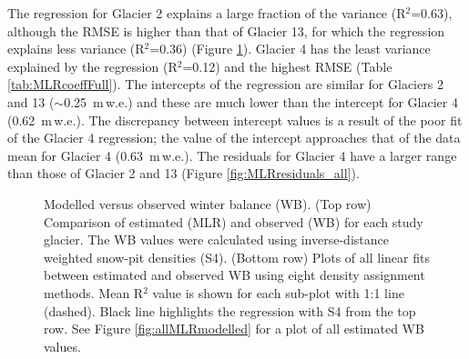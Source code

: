 \documentclass{sfuthesis}
\begin{document}
The regression for Glacier 2 explains a large fraction of the variance (R$^2$=0.63), although the RMSE is higher than that of Glacier 13, for which the regression explains less variance (R$^2$=0.36) (Figure \ref{fig:MLRfit}). Glacier 4 has the least variance explained by the regression (R$^2$=0.12) and the highest RMSE (Table \ref{tab:MLRcoeffFull}). The intercepts of the regression are similar for Glaciers 2 and 13 ($\sim$0.25 \,m\,w.e.) and these are much lower than the intercept for Glacier 4 (0.62 \,m\,w.e.). The discrepancy between intercept values is a result of the poor fit of the Glacier 4 regression; the value of the intercept approaches that of the data mean for Glacier 4 (0.63 \,m\,w.e.). The residuals for Glacier 4 have a larger range than those of Glacier 2 and 13 (Figure \ref{fig:MLRresiduals_all}).

\begin{figure}[H]
    \centering
    \begin{subfigure}[b]{\textwidth}
    \end{subfigure}
    
    \begin{subfigure}[b]{\textwidth}
    \end{subfigure}

    \caption[MLR-modelled versus observed winter balance]{Modelled versus observed winter balance (WB). (Top row) Comparison of estimated (MLR) and observed (WB) for each study glacier. The WB values were calculated using inverse-distance weighted snow-pit densities (S4). (Bottom row) Plots of all linear fits between estimated and observed WB using eight density assignment methods. Mean R$^2$ value is shown for each sub-plot with 1:1 line (dashed). Black line highlights the regression with S4 from the top row. See Figure \ref{fig:allMLRmodelled} for a plot of all estimated WB values.}
    \label{fig:MLRfit}
\end{figure}
\end{document}
